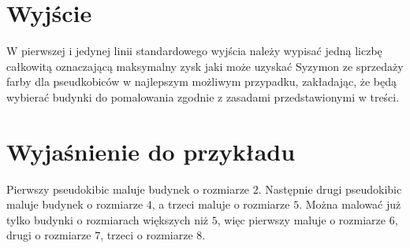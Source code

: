 \documentclass[zad,zawodnik,utf8]{sinol}
\begin{document}
\begin{tasktext}
	\section{Wyjście}
	W pierwszej i jedynej linii standardowego wyjścia należy wypisać jedną liczbę całkowitą oznaczającą maksymalny zysk jaki może uzyskać Syzymon ze sprzedaży farby dla pseudkobiców w najlepszym możliwym przypadku, zakładając, że będą wybierać budynki do pomalowania zgodnie z zasadami przedstawionymi w treści.
\makecompactexample

	\section{Wyjaśnienie do przykładu}
		Pierwszy pseudokibic maluje budynek o rozmiarze $2$. Następnie drugi pseudokibic maluje budynek o rozmiarze $4$, a trzeci maluje o rozmiarze $5$. Można malować już tylko budynki o rozmiarach większych niż $5$, więc pierwszy maluje o rozmiarze $6$, drugi o rozmiarze $7$, trzeci o rozmiarze $8$.

\end{tasktext}
\end{document}
